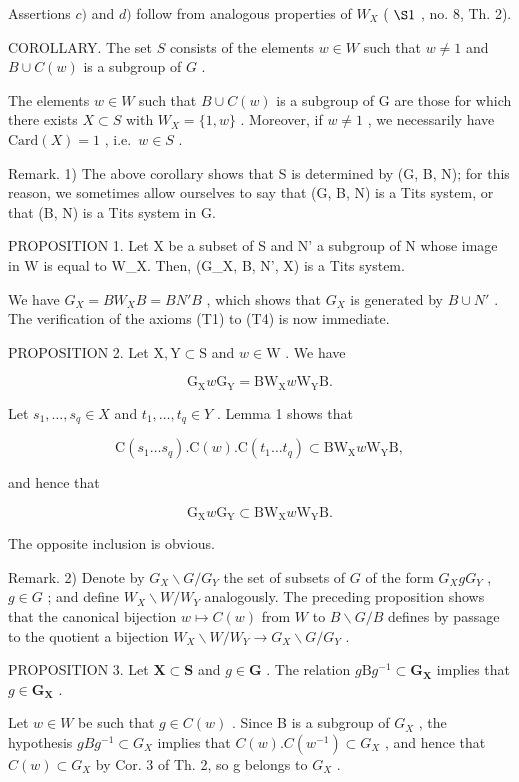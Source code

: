Assertions \(c)\) and \(d)\) follow from analogous properties of \(W_X\) ( \(\S 1\) , no. 8, Th. 2).

COROLLARY. The set \(S\) consists of the elements \(w \in W\) such that \(w \neq 1\) and \(B \cup C(w)\) is a subgroup of \(G\) .

The elements \(w \in W\) such that \(B \cup C(w)\) is a subgroup of G are those for which there exists \(X \subset S\) with \(W_{X} = \{1, w\}\) . Moreover, if \(w \neq 1\) , we necessarily have \(\text{Card}(X) = 1\) , i.e.~\(w \in S\) .

Remark. 1) The above corollary shows that S is determined by (G, B, N); for this reason, we sometimes allow ourselves to say that (G, B, N) is a Tits system, or that (B, N) is a Tits system in G.

PROPOSITION 1. Let X be a subset of S and N' a subgroup of N whose image in W is equal to W\_X. Then, (G\_X, B, N', X) is a Tits system.

We have \(G_{X} = BW_{X}B = BN'B\) , which shows that \(G_{X}\) is generated by \(B \cup N'\) . The verification of the axioms (T1) to (T4) is now immediate.

PROPOSITION 2. Let \(\mathrm{X}, \mathrm{Y} \subset \mathrm{S}\) and \(w \in \mathrm{W}\) . We have

\[
\mathrm{G} _ {\mathrm{X}} w \mathrm{G} _ {\mathrm{Y}} = \mathrm{BW} _ {\mathrm{X}} w \mathrm{W} _ {\mathrm{Y}} \mathrm{B}.
\]

Let \(s_1, \ldots, s_q \in X\) and \(t_1, \ldots, t_q \in Y\) . Lemma 1 shows that

\[
\mathrm{C} (s _ {1} \dots s _ {q}). \mathrm{C} (w). \mathrm{C} (t _ {1} \dots t _ {q}) \subset \mathrm{BW} _ {\mathrm{X}} w \mathrm{W} _ {\mathrm{Y}} \mathrm{B},
\]

and hence that

\[
\mathrm{G} _ {\mathrm{X}} w \mathrm{G} _ {\mathrm{Y}} \subset \mathrm{BW} _ {\mathrm{X}} w \mathrm{W} _ {\mathrm{Y}} \mathrm{B}.
\]

The opposite inclusion is obvious.

Remark. 2) Denote by \(G_X \backslash G / G_Y\) the set of subsets of \(G\) of the form \(G_X gG_Y\) , \(g \in G\) ; and define \(W_X \backslash W / W_Y\) analogously. The preceding proposition shows that the canonical bijection \(w \mapsto C(w)\) from \(W\) to \(B \backslash G / B\) defines by passage to the quotient a bijection \(W_X \backslash W / W_Y \to G_X \backslash G / G_Y\) .

PROPOSITION 3. Let \(\mathbf{X} \subset \mathbf{S}\) and \(g \in \mathbf{G}\) . The relation \(g\mathrm{B}g^{-1} \subset \mathbf{G}_{\mathbf{X}}\) implies that \(g \in \mathbf{G}_{\mathbf{X}}\) .

Let \(w \in W\) be such that \(g \in C(w)\) . Since B is a subgroup of \(G_X\) , the hypothesis \(gBg^{-1} \subset G_X\) implies that \(C(w).C(w^{-1}) \subset G_X\) , and hence that \(C(w) \subset G_X\) by Cor. 3 of Th. 2, so g belongs to \(G_X\) .

